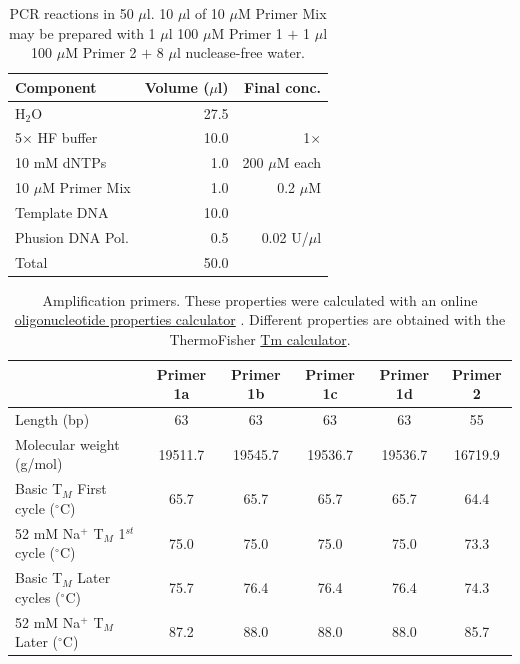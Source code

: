 \documentclass[a4paper,12pt]{article}
\begin{document}
\begin{table}
\begin{center}
\caption{PCR reactions in 50 $\mu$l. 10 $\mu$l of 10 $\mu$M Primer Mix may be prepared with 1 $\mu$l 100 $\mu$M Primer 1 $+$ 1 $\mu$l 100 $\mu$M Primer 2 $+$ 8 $\mu$l nuclease-free water.}\label{tau:PCR}
\vspace*{0.2cm}
\begin{tabular}{lrr}
\toprule
Component&Volume ($\mu$l)&Final conc.\\
\midrule
H$_2$O&27.5&\\
5$\times$ HF buffer&10.0&1$\times$\\
10 mM dNTPs&1.0&200 $\mu$M each\\
10 $\mu$M Primer Mix&1.0&0.2 $\mu$M\\
Template DNA&10.0&\\
Phusion DNA Pol.&0.5&0.02 U/$\mu$l\\
\midrule
Total&50.0&\\
\bottomrule
\end{tabular}
\end{center}
\end{table}

\begin{table}
\begin{center}
\caption{Amplification primers. These properties were calculated with an online \href{http://biotools.nubic.northwestern.edu/OligoCalc.html}{oligonucleotide properties calculator} \cite{Kibbe2007}. Different properties are obtained with the ThermoFisher \href{https://www.thermofisher.com/es/es/home/brands/thermo-scientific/molecular-biology/molecular-biology-learning-center/molecular-biology-resource-library/thermo-scientific-web-tools/tm-calculator.html}{Tm calculator}.}\label{tau:primers}
\vspace*{0.2cm}
\begin{tabular}{lccccc}
\toprule
&Primer 1a&Primer 1b&Primer 1c&Primer 1d&Primer 2\\
\midrule
Length (bp)&63&63&63&63&55\\
Molecular weight (g/mol)&19511.7&19545.7&19536.7&19536.7&16719.9\\
Basic T$_M$ First cycle ($^{\circ}$C)&65.7&65.7&65.7&65.7&64.4\\
52 mM Na$^{+}$ T$_M$ 1$^{st}$ cycle ($^{\circ}$C)&75.0&75.0&75.0&75.0&73.3\\
Basic T$_M$ Later cycles ($^{\circ}$C)&75.7&76.4&76.4&76.4&74.3\\
52 mM Na$^{+}$ T$_M$ Later ($^{\circ}$C)&87.2&88.0&88.0&88.0&85.7\\
\bottomrule
\end{tabular}
\end{center}
\end{table}
\end{document}
